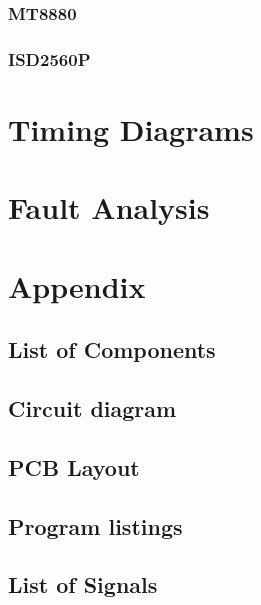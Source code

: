 \documentclass[a4paper,11pt]{article}
\begin{document}
		\subsubsection{MT8880}
		\subsubsection{ISD2560P}

\section{Timing Diagrams}

\section{Fault Analysis}

\section{Appendix}

	\subsection{List of Components}

	\subsection{Circuit diagram}

	\subsection{PCB Layout}

	\subsection{Program listings}

	\subsection{List of Signals}
\end{document}
